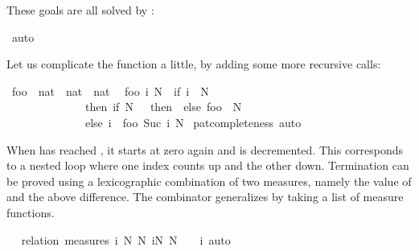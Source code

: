 \begin{isabellebody}
\begin{isamarkuptxt}
  These goals are all solved by :%
\end{isamarkuptxt}%
\isamarkuptrue%
\isamarkupfalse%
\ auto\isanewline
{}\isamarkupfalse%
%
\endisatagproof
{\isafoldproof}%
%
\isadelimproof
%
\endisadelimproof
%
\begin{isamarkuptext}%
Let us complicate the function a little, by adding some more
  recursive calls:%
\end{isamarkuptext}%
\isamarkuptrue%
\isamarkupfalse%
\ foo\ {}{}\ {}nat\ {}\ nat\ {}\ nat{}\isanewline
{}\isanewline
\ \ {}foo\ i\ N\ {}\ {}if\ i\ {}\ N\ \isanewline
\ \ \ \ \ \ \ \ \ \ \ \ \ \ then\ {}if\ N\ {}\ {}\ then\ {}\ else\ foo\ {}\ {}N\ {}\ {}{}{}\isanewline
\ \ \ \ \ \ \ \ \ \ \ \ \ \ else\ i\ {}\ foo\ {}Suc\ i{}\ N{}{}\isanewline
%
\isadelimproof
%
\endisadelimproof
%
\isatagproof
{}\isamarkupfalse%
\ pat{}completeness\ auto%
\endisatagproof
{\isafoldproof}%
%
\isadelimproof
%
\endisadelimproof
%
\begin{isamarkuptext}%
When  has reached , it starts at zero again
  and  is decremented.
  This corresponds to a nested
  loop where one index counts up and the other down. Termination can
  be proved using a lexicographic combination of two measures, namely
  the value of  and the above difference. The  combinator generalizes  by taking a
  list of measure functions.%
\end{isamarkuptext}%
\isamarkuptrue%
\isamarkupfalse%
\ \isanewline
%
\isadelimproof
%
\endisadelimproof
%
\isatagproof
{}\isamarkupfalse%
\ {}relation\ {}measures\ {}{}{}i{}\ N{}{}\ N{}\ {}{}i{}N{}{}\ N\ {}\ {}\ {}\ i{}{}{}\ auto%

\end{isabellebody}
